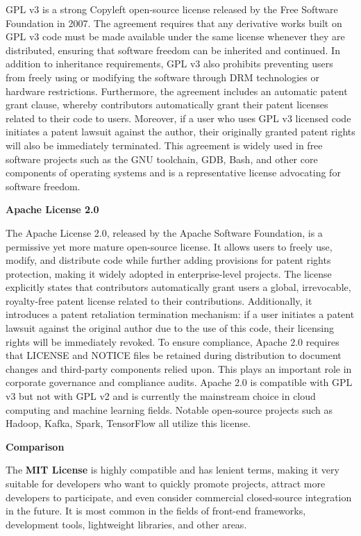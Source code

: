 \documentclass[12pt]{article}
\begin{document}
    GPL v3 is a strong Copyleft open-source license released by the Free Software Foundation in 2007. The agreement requires that any derivative works built on GPL v3 code must be made available under the same license whenever they are distributed, ensuring that software freedom can be inherited and continued. In addition to inheritance requirements, GPL v3 also prohibits preventing users from freely using or modifying the software through DRM technologies or hardware restrictions. Furthermore, the agreement includes an automatic patent grant clause, whereby contributors automatically grant their patent licenses related to their code to users. Moreover, if a user who uses GPL v3 licensed code initiates a patent lawsuit against the author, their originally granted patent rights will also be immediately terminated. This agreement is widely used in free software projects such as the GNU toolchain, GDB, Bash, and other core components of operating systems and is a representative license advocating for software freedom.


  \noindent\textbf{Apache License 2.0}

    The Apache License 2.0, released by the Apache Software Foundation, is a permissive yet more mature open-source license. It allows users to freely use, modify, and distribute code while further adding provisions for patent rights protection, making it widely adopted in enterprise-level projects. The license explicitly states that contributors automatically grant users a global, irrevocable, royalty-free patent license related to their contributions. Additionally, it introduces a patent retaliation termination mechanism: if a user initiates a patent lawsuit against the original author due to the use of this code, their licensing rights will be immediately revoked. To ensure compliance, Apache 2.0 requires that LICENSE and NOTICE files be retained during distribution to document changes and third-party components relied upon. This plays an important role in corporate governance and compliance audits. Apache 2.0 is compatible with GPL v3 but not with GPL v2 and is currently the mainstream choice in cloud computing and machine learning fields. Notable open-source projects such as Hadoop, Kafka, Spark, TensorFlow all utilize this license.

\noindent\textbf{Comparison}

The \textbf{MIT License} is highly compatible and has lenient terms, making it very suitable for developers who want to quickly promote projects, attract more developers to participate, and even consider commercial closed-source integration in the future. It is most common in the fields of front-end frameworks, development tools, lightweight libraries, and other areas. 
\end{document}
